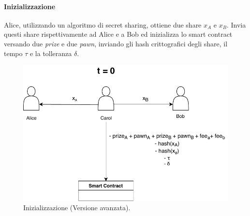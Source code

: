\paragraph{Inizializzazione}
Alice, utilizzando un algoritmo di secret sharing, ottiene due share
$ x_A $ e $ x_B $. Invia questi share rispettivamente ad Alice e a Bob ed inizializza
lo smart contract versando due \textit{prize} e due \textit{pawn},
inviando gli hash crittografici
degli share, il tempo $ \tau $ e la tolleranza $ \delta $.
\begin{figure}[H]
	\centering
	\includegraphics[width=0.6\linewidth]{images/chap_protocollo/avanzato-creazione.pdf}
	\caption{Inizializzazione (Versione avanzata).}
\end{figure}




